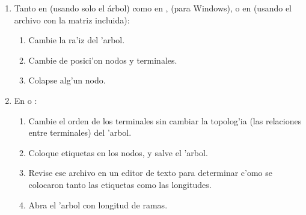 {{\begin{enumerate}
\begin{enumerate}
\item Haga una b\'usqueda de cladogramas para su matriz de vertebrados, usando los par\'ametros por omisi\'on.
\item Reporte, la cantidad de 'arboles obtenidos y la longitud de los mismos.
\item Examine las agrupaciones obtenidas, identifique los caracteres que soportan los nodos.
\item Mapee los caracteres en los \'arboles usando distintos tipos de optimizaciones: en  ACTRAN, DELTRAN y no ambigua, En  (para Windows) ( y seleccione un solo \'arbol y algunos caracteres) y en : Dollo e Irreversible (C-S); revise c'omo cambian las optimizaciones en los distintos nodos.
\item Cambie de posici\'on algunos nodos o terminales de la topolog'ia, y observe c'omo cambia la longitud del cladograma y los estados asignados a los nodos o la forma como los caracteres son mapeados, pruebe tambi\'en moviendo ramas completas.
\end{enumerate}
\item Tanto en  (usando solo el \'arbol) como en ,  (para Windows), o en  (usando el archivo con la matriz incluida):
\begin{enumerate}
\item Cambie la ra'iz del 'arbol.
\item Cambie de posici'on nodos y terminales.
\item Colapse alg'un nodo.
\end{enumerate}
\item En  o :
\begin{enumerate}
\item Cambie el orden de los terminales sin cambiar la topolog'ia (las relaciones entre terminales) del 'arbol.
\item Coloque etiquetas en los nodos, y salve el 'arbol.
\item Revise ese archivo en un editor de texto para determinar c'omo se colocaron tanto las etiquetas como las longitudes.
\item Abra el 'arbol con longitud de ramas.
\end{enumerate}
\end{enumerate}}}
